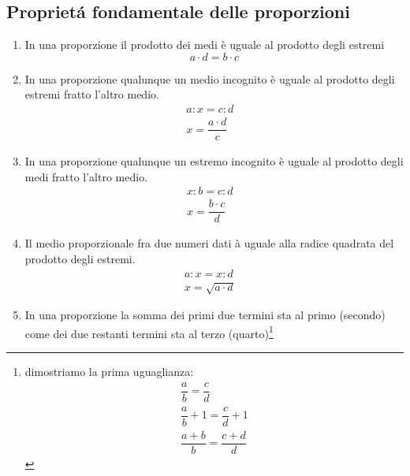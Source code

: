 \subsection{Propriet\'{a} fondamentale delle proporzioni}\label{prop:fond}
\begin{enumerate}
	\item In una proporzione il prodotto dei medi è uguale al prodotto degli estremi \[a\cdot d= b\cdot c\]
	\item In una proporzione qualunque un medio incognito è uguale al prodotto degli estremi fratto l'altro medio. 
	\begin{align*}
	a:x=c:d&\\
	x=\dfrac{a\cdot d}{c}&
	\end{align*}
	\item In una proporzione qualunque un estremo incognito è uguale al prodotto degli medi fratto l'altro medio. 
	\begin{align*}
	x:b=c:d&\\
	x=\dfrac{b\cdot c}{d}&
	\end{align*}
	\item Il medio proporzionale fra due numeri dati à uguale alla radice quadrata del  prodotto degli estremi.
		\begin{align*}
		a:x=x:d&\\
		x=\sqrt{a\cdot d}&
		\end{align*}
	\item In una proporzione la somma dei primi due termini sta al primo (secondo) come dei due restanti termini sta al terzo (quarto)\footnote{dimostriamo la prima uguaglianza:
		\begin{gather*}
		\dfrac{a}{b}=\dfrac{c}{d}\\
		\dfrac{a}{b}+1=\dfrac{c}{d}+1\\
		\dfrac{a+b}{b}=\dfrac{c+d}{d}
		\end{gather*}
		
}
\end{enumerate}
